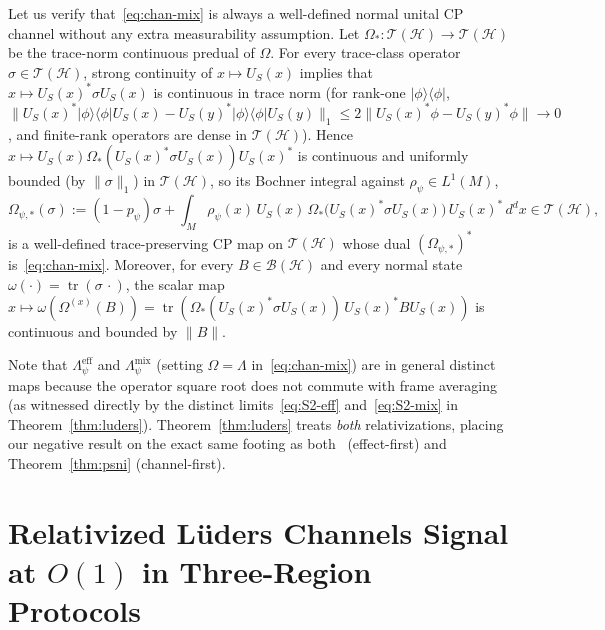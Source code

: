 \documentclass[11pt,a4paper]{article}
\theoremstyle{definition}
\theoremstyle{remark}
\newcommand{\HH}{\mathcal{H}}
\newcommand{\BB}{\mathcal{B}}
\newcommand{\TT}{\mathcal{T}}
\newcommand{\tr}{\operatorname{tr}}
\newcommand{\ket}[1]{|#1\rangle}
\newcommand{\bra}[1]{\langle #1|}
\newcommand{\norm}[1]{\|#1\|}
\begin{document}
Let us verify that~\eqref{eq:chan-mix} is always a well-defined normal unital CP channel without any extra measurability assumption. Let $\Omega_*:\TT(\HH)\to\TT(\HH)$ be the trace-norm continuous predual of $\Omega$. For every trace-class operator $\sigma\in\TT(\HH)$, strong continuity of $x\mapsto U_S(x)$ implies that $x\mapsto U_S(x)^*\sigma U_S(x)$ is continuous in trace norm (for rank-one $\ket{\phi}\bra{\phi}$, $\norm{U_S(x)^*\ket{\phi}\bra{\phi}U_S(x) - U_S(y)^*\ket{\phi}\bra{\phi}U_S(y)}_1 \le 2\norm{U_S(x)^*\phi - U_S(y)^*\phi}\to 0$, and finite-rank operators are dense in $\TT(\HH)$). Hence $x\mapsto U_S(x)\Omega_*(U_S(x)^*\sigma U_S(x))U_S(x)^*$ is continuous and uniformly bounded (by $\norm{\sigma}_1$) in $\TT(\HH)$, so its Bochner integral against $\rho_\psi\in L^1(M)$,
\[
\Omega_{\psi,*}(\sigma) := (1-p_\psi)\sigma + \int_M \rho_\psi(x)\,U_S(x)\,\Omega_*\!\bigl(U_S(x)^*\sigma U_S(x)\bigr)\,U_S(x)^*\,d^dx \in \TT(\HH),
\]
is a well-defined trace-preserving CP map on $\TT(\HH)$ whose dual $(\Omega_{\psi,*})^*$ is~\eqref{eq:chan-mix}. Moreover, for every $B\in\BB(\HH)$ and every normal state $\omega(\cdot)=\tr(\sigma\,\cdot)$, the scalar map $x\mapsto \omega(\Omega^{(x)}(B)) = \tr(\Omega_*(U_S(x)^*\sigma U_S(x))\,U_S(x)^* B U_S(x))$ is continuous and bounded by $\norm{B}$.

Note that $\Lambda_\psi^{\mathrm{eff}}$ and $\Lambda_\psi^{\mathrm{mix}}$ (setting $\Omega=\Lambda$ in~\eqref{eq:chan-mix}) are in general distinct maps because the operator square root does not commute with frame averaging (as witnessed directly by the distinct limits~\eqref{eq:S2-eff} and~\eqref{eq:S2-mix} in Theorem~\ref{thm:luders}). Theorem~\ref{thm:luders} treats \emph{both} relativizations, placing our negative result on the exact same footing as both~\cite[Cor.~4.7]{FewsterLoveridge2026} (effect-first) and Theorem~\ref{thm:psni} (channel-first).

\section{Relativized L\"uders Channels Signal at \texorpdfstring{$O(1)$}{O(1)} in Three-Region Protocols}
\label{sec:luders}
\end{document}
